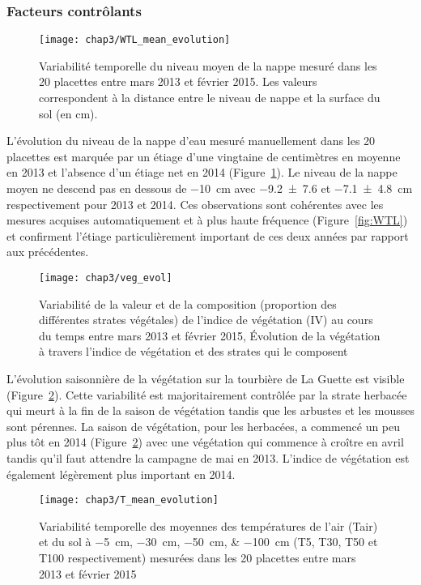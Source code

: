 \subsubsection{Facteurs contrôlants}

\begin{figure}
\centering
\texttt{[image: chap3/WTL\_mean\_evolution]}
\caption{Variabilité temporelle du niveau moyen de la nappe mesuré dans les 20 placettes entre mars 2013 et février 2015. Les valeurs correspondent à la distance entre le niveau de nappe et la surface du sol (en cm).}
\label{fig:WTL_mean_evolution}
\end{figure}

L'évolution du niveau de la nappe d'eau mesuré manuellement dans les 20 placettes est marquée par un étiage d'une vingtaine de centimètres en moyenne en 2013 et l'absence d'un étiage net en 2014 (Figure~\ref{fig:WTL_mean_evolution}).
Le niveau de la nappe moyen ne descend pas en dessous de \SI{-10}{\cm} avec \num{-9.2(76)} et \SI{-7.1(48)}{\centi\metre} respectivement pour 2013 et 2014.
Ces observations sont cohérentes avec les mesures acquises automatiquement et à plus haute fréquence (Figure~\ref{fig:WTL}) et confirment l'étiage particulièrement important de ces deux années par rapport aux précédentes.

\begin{figure}
\centering
\texttt{[image: chap3/veg\_evol]}
\caption{Variabilité de la valeur et de la composition (proportion des différentes strates végétales) de l'indice de végétation (IV) au cours du temps entre mars 2013 et février 2015, 
Évolution de la végétation à travers l'indice de végétation et des strates qui le composent}
\label{fig:veg_evol}
\end{figure}

L'évolution saisonnière de la végétation sur la tourbière de La Guette est visible (Figure~\ref{fig:veg_evol}).
Cette variabilité est majoritairement contrôlée par la strate herbacée qui meurt à la fin de la saison de végétation tandis que les arbustes et les mousses sont pérennes.
La saison de végétation, pour les herbacées, a commencé un peu plus tôt en 2014 (Figure~\ref{fig:veg_evol}) avec une végétation qui commence à croître en avril tandis qu'il faut attendre la campagne de mai en 2013.
L'indice de végétation est également légèrement plus important en 2014.

\begin{figure}
\centering
\texttt{[image: chap3/T\_mean\_evolution]}
\caption{Variabilité temporelle des moyennes des températures de l'air (Tair) et du sol à \SIlist{-5;-30;-50;-100}{\centi\metre} (T5, T30, T50 et T100 respectivement) mesurées dans les 20 placettes entre mars 2013 et février 2015}
\label{fig:T_mean_evolution}
\end{figure}

